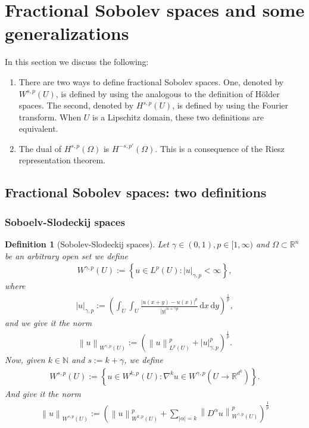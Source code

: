 \documentclass[
    a4paper,
    DIV=14,
    abstract=true,
    numbers=noenddot
]
{scrartcl}
\newtheorem{definition}[theorem]{Definition}
\theoremstyle{definition}
\newcommand{\set}[1]{\left\{#1\right\}}
\renewcommand{\norm}[1]{\left\lVert #1 \right\rVert}\renewcommand{\abs}[1]{\left| #1 \right|}
\renewcommand{\d}{\,\mathrm{d}}\newcommand{\dx}{\,\mathrm{d}x}
\newcommand{\N}{\mathbb{N}}
\newcommand{\R}{\mathbb{R}}
\begin{document}
\section{Fractional Sobolev spaces and  some generalizations}
In this section we discuss the following:
\begin{enumerate}
	\item There are two ways to define fractional Sobolev spaces. One, denoted by $W^{s,p}(U)$,  is defined by using the analogous to the definition of H\"older spaces. The second, denoted by $H^{s,p}(U)$, is defined by using the Fourier transform. When $U$ is a Lipschitz domain, these two definitions are equivalent.
	\item The dual of $H^{s,p}(\Omega )$ is $H^{-s,p'}(\Omega )$. This is a consequence of the Riesz representation theorem.
\end{enumerate}
\subsection{Fractional Sobolev spaces: two definitions}
\subsubsection{Soboelv-Slodeckij spaces}
\begin{definition}[Sobolev-Slodeckij spaces]\label{soledkij def}
	Let $\gamma  \in (0,1), p \in [1,\infty)$ and $\Omega  \subset \R^n$ be an arbitrary open set we define
	\begin{align*}
		W^{\gamma  ,p}(U):= \set{u \in L^p(U): | u |_{\gamma,p}<\infty},
	\end{align*}
	where
	\begin{align}\label{fractional seminorm}
		| u |_{\gamma  ,p}:= \left(\int_{U}\int_{U}\frac{\abs{u(x+y)-u(x)}^p}{\abs{y}^{n+\gamma p}}\d x \d y\right)^{\frac{1}{p}},
	\end{align}
	and we give it the norm
	\begin{align*}
		\norm{u}_{W^{\gamma,p}(U)}:= \left(\norm{u}_{L^p(U)}^p+| u |_{\gamma ,p}^p\right)^{\frac{1}{p}}.
	\end{align*}
	Now, given $k \in \N$ and $s:=k+\gamma $, we define
	\begin{align*}
		W^{s ,p}(U):= \set{u \in W^{k ,p}(U): \nabla^k  u \in W^{\gamma ,p}(U \to \R^{d^k})}.
	\end{align*}
	And give it the norm
	\begin{align}\label{norm def}
		\norm{u}_{W^{s,p}(U)}:= \left(\norm{u}_{W^{k,p}(U)}^p+ \sum_{\abs{\alpha}=k }\norm{D^\alpha u}_{W^{\gamma ,p}(U)}^p\right)^\frac{1}{p}
	\end{align}
\end{definition}
\end{document}
